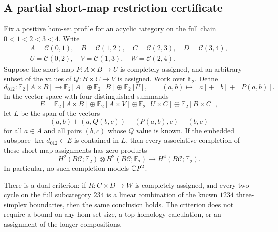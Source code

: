 \subsection{A partial short-map restriction certificate}

\begin{proposition}
\label{A7:partial-short-restriction}
Fix a positive hom-set profile for an acyclic category on the full
chain $0<1<2<3<4$. Write
\[
 \begin{gathered}
 A=\mathcal C(0,1),\quad B=\mathcal C(1,2),\quad
 C=\mathcal C(2,3),\quad D=\mathcal C(3,4),\\
 U=\mathcal C(0,2),\quad V=\mathcal C(1,3),\quad
 W=\mathcal C(2,4).
 \end{gathered}
\]
Suppose the short map $P:A\times B\to U$ is completely assigned,
and an arbitrary subset of the values of $Q:B\times C\to V$ is
assigned. Work over $\mathbb F_2$. Define
\[
 d_{012}:\mathbb F_2[A\times B]\longrightarrow
 \mathbb F_2[A]\oplus\mathbb F_2[B]\oplus\mathbb F_2[U],
 \qquad (a,b)\longmapsto [a]+[b]+[P(a,b)].
\]
In the vector space with four distinguished summands
\[
 E=\mathbb F_2[A\times B]\oplus\mathbb F_2[A\times V]
       \oplus\mathbb F_2[U\times C]\oplus\mathbb F_2[B\times C],
\]
let $L$ be the span of the vectors
\[
 (a,b)+(a,Q(b,c))+(P(a,b),c)+(b,c)
 \tag{\(\dagger\)}
\]
for all $a\in A$ and all pairs $(b,c)$ whose $Q$ value is known.
If the embedded subspace $\ker d_{012}\subset E$ is contained
in $L$, then every associative completion of these short-map
assignments has zero products
\[
 H^2(B\mathcal C;\mathbb F_2)\otimes
 H^2(B\mathcal C;\mathbb F_2)\longrightarrow
 H^4(B\mathcal C;\mathbb F_2).
\]
In particular, no such completion models $\mathbb{C}P^2$.

There is a dual criterion: if $R:C\times D\to W$ is completely
assigned, and every two-cycle on the full subcategory $234$ is
a linear combination of the known $1234$ three-simplex
boundaries, then the same conclusion holds. The criterion does
not require a bound on any hom-set size, a top-homology
calculation, or an assignment of the longer compositions.
\end{proposition}
